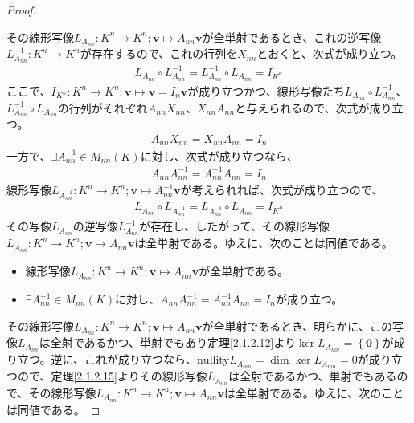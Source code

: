 \documentclass[dvipdfmx]{jsarticle}
\begin{document}
\begin{proof}
\begin{itemize}
\end{itemize}\par
その線形写像$L_{A_{nn}}:K^{n} \rightarrow K^{n};\mathbf{v} \mapsto A_{nn}\mathbf{v}$が全単射であるとき、これの逆写像$L_{A_{nn}}^{- 1}:K^{n} \rightarrow K^{n}$が存在するので、これの行列を$X_{nn}$とおくと、次式が成り立つ。
\begin{align*}
L_{A_{nn}} \circ L_{A_{nn}}^{- 1} = L_{A_{nn}}^{- 1} \circ L_{A_{nn}} = I_{K^{n}}
\end{align*}
ここで、$I_{K^{n}}:K^{n} \rightarrow K^{n};\mathbf{v} \mapsto \mathbf{v} = I_{n}\mathbf{v}$が成り立つかつ、線形写像たち$L_{A_{nn}} \circ L_{A_{nn}}^{- 1}$、$L_{A_{nn}}^{- 1} \circ L_{A_{nn}}$の行列がそれぞれ$A_{nn}X_{nn}$、$X_{nn}A_{nn}$と与えられるので、次式が成り立つ。
\begin{align*}
A_{nn}X_{nn} = X_{nn}A_{nn} = I_{n}
\end{align*}
一方で、$\exists A_{nn}^{- 1} \in M_{nn}(K)$に対し、次式が成り立つなら、
\begin{align*}
A_{nn}A_{nn}^{- 1} = A_{nn}^{- 1}A_{nn} = I_{n}
\end{align*}
線形写像$L_{A_{nn}^{- 1}}:K^{n} \rightarrow K^{n};\mathbf{v} \mapsto A_{nn}^{- 1}\mathbf{v}$が考えられれば、次式が成り立つので、
\begin{align*}
L_{A_{nn}} \circ L_{A_{nn}^{- 1}} = L_{A_{nn}^{- 1}} \circ L_{A_{nn}} = I_{K^{n}}
\end{align*}
その写像$L_{A_{nn}}$の逆写像$L_{A_{nn}}^{- 1}$が存在し、したがって、その線形写像$L_{A_{nn}}:K^{n} \rightarrow K^{n};\mathbf{v} \mapsto A_{nn}\mathbf{v}$は全単射である。ゆえに、次のことは同値である。
\begin{itemize}
\item
  線形写像$L_{A_{nn}}:K^{n} \rightarrow K^{n};\mathbf{v} \mapsto A_{nn}\mathbf{v}$が全単射である。
\item
  $\exists A_{nn}^{- 1} \in M_{nn}(K)$に対し、$A_{nn}A_{nn}^{- 1} = A_{nn}^{- 1}A_{nn} = I_{n}$が成り立つ。
\end{itemize}\par
その線形写像$L_{A_{nn}}:K^{n} \rightarrow K^{n};\mathbf{v} \mapsto A_{nn}\mathbf{v}$が全単射であるとき、明らかに、この写像$L_{A_{nn}}$は全射であるかつ、単射でもあり定理\ref{2.1.2.12}より$\ker L_{A_{mn}} = \left\{ \mathbf{0} \right\}$が成り立つ。逆に、これが成り立つなら、${\mathrm{nullity}}L_{A_{mn}} = \dim{\ker L_{A_{mn}}} = 0$が成り立つので、定理\ref{2.1.2.15}よりその線形写像$L_{A_{nn}}$は全射であるかつ、単射でもあるので、その線形写像$L_{A_{nn}}:K^{n} \rightarrow K^{n};\mathbf{v} \mapsto A_{nn}\mathbf{v}$は全単射である。ゆえに、次のことは同値である。

\end{proof}
\end{document}
